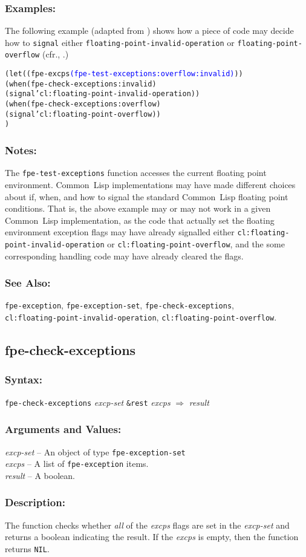 \documentclass[10pt,fleqn]{article}
\newcommand{\CL}{\textsf{Common~Lisp}}
\newcommand{\code}[1]{\texttt{#1}}
\newcommand{\varname}[1]{\textit{#1}}
\newcommand{\DDictionaryItem}[1]{\vspace*{6pt}\noindent\hrulefill\vspace*{-9pt}\subsection*{#1}}
\newcommand{\DSyntax}{\subsubsection*{Syntax:}}
\newcommand{\DArgsNValues}{\subsubsection*{Arguments and Values:}}
\newcommand{\DDescription}{\subsubsection*{Description:}}
\newcommand{\DExamples}{\subsubsection*{Examples:}}
\newcommand{\DNotes}{\subsubsection*{Notes:}}
\newcommand{\DSeeAlso}{\subsubsection*{See Also:}}
\begin{document}
\DExamples{}

The following example (adapted from \cite{C18}) shows how a piece of
code may decide how to \code{signal} either
\code{floating-point-invalid-operation} or
\code{floating-point-overflow} (cfr., \cite{ANSIHyperSpec}.)

\begin{alltt}
(let ((fpe-excps \textcolor{blue}{(fpe-test-exceptions :overflow :invalid)}))
   (when (fpe-check-exceptions :invalid)
     (signal 'cl:floating-point-invalid-operation))
   (when (fpe-check-exceptions :overflow)
     (signal 'cl:floating-point-overflow))
   )
\end{alltt}

\DNotes{}

The \code{fpe-test-exceptions} function accesses the current floating
point environment.  \CL{} implementations may have made different
choices about if, when, and how to signal the standard \CL{} floating
point conditions.  That is, the above example may or may not work in a
given \CL{} implementation, as the code that actually set the floating
environment exception flags may have already signalled either
\code{cl:floating-point-invalid-operation} or
\code{cl:floating-point-overflow}, and the some corresponding handling
code may have already cleared the flags.

\DSeeAlso{}

\code{fpe-exception}, \code{fpe-exception-set},
\code{fpe-check-exceptions},\\
\code{cl:floating-point-invalid-operation},
\code{cl:floating-point-overflow}.





\DDictionaryItem{fpe-check-exceptions}

\DSyntax{}

\code{fpe-check-exceptions} \varname{excp-set} \code{\&rest} \varname{excps}
$\Rightarrow$ \varname{result}

\DArgsNValues{}

\varname{excp-set} -- An object of type \code{fpe-exception-set}\\
\varname{excps} -- A list of \code{fpe-exception} items.\\
\varname{result} -- A boolean.

\DDescription{}

The function checks whether \emph{all} of the \varname{excps} flags
are set in the \varname{excp-set} and returns a boolean indicating the
result.  If the \varname{excps} is empty, then the function returns
\code{NIL}.
\end{document}
